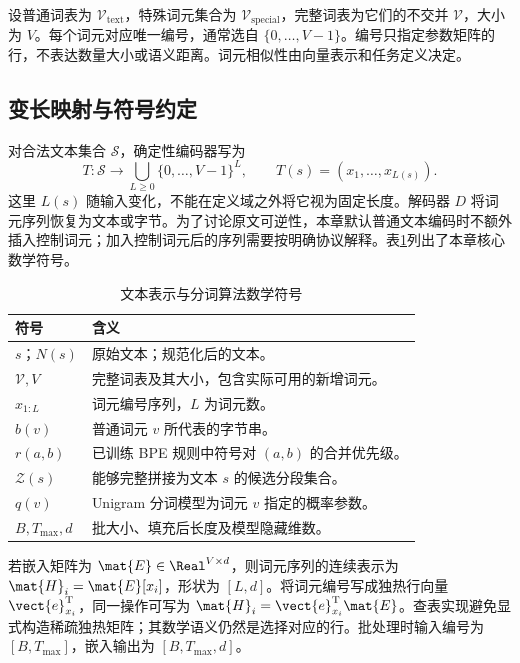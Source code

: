 \documentclass[../textbook.tex]{subfiles}
\begin{document}
设普通词表为 $\mathcal V_{\mathrm{text}}$，特殊词元集合为 $\mathcal V_{\mathrm{special}}$，完整词表为它们的不交并 $\mathcal V$，大小为 $V$。每个词元对应唯一编号，通常选自 $\{0,\ldots,V-1\}$。编号只指定参数矩阵的行，不表达数量大小或语义距离。词元相似性由向量表示和任务定义决定。

\subsection{变长映射与符号约定}
对合法文本集合 $\mathcal S$，确定性编码器写为
\begin{equation}\label{eq:tok-map}
 T:\mathcal S\longrightarrow \bigcup_{L\ge0}\{0,\ldots,V-1\}^{L},
 \qquad T(s)=(x_1,\ldots,x_{L(s)}).
\end{equation}
这里 $L(s)$ 随输入变化，不能在定义域之外将它视为固定长度。解码器 $D$ 将词元序列恢复为文本或字节。为了讨论原文可逆性，本章默认普通文本编码时不额外插入控制词元；加入控制词元后的序列需要按明确协议解释。表\ref{tab:tokenization-notations}列出了本章核心数学符号。

\begin{table}[htbp]
\centering
\caption{文本表示与分词算法数学符号}\label{tab:tokenization-notations}
\begin{tabularx}{\linewidth}{p{24mm}X}
\toprule 符号 & 含义\\\midrule
$s$；$N(s)$ & 原始文本；规范化后的文本。\\
$\mathcal V,V$ & 完整词表及其大小，包含实际可用的新增词元。\\
$x_{1:L}$ & 词元编号序列，$L$ 为词元数。\\
$b(v)$ & 普通词元 $v$ 所代表的字节串。\\
$r(a,b)$ & 已训练 BPE 规则中符号对 $(a,b)$ 的合并优先级。\\
$\mathcal Z(s)$ & 能够完整拼接为文本 $s$ 的候选分段集合。\\
$q(v)$ & Unigram 分词模型为词元 $v$ 指定的概率参数。\\
$B,T_{\max},d$ & 批大小、填充后长度及模型隐藏维数。\\
\bottomrule
\end{tabularx}
\end{table}

若嵌入矩阵为 $\mat{E}\in\Real^{V\times d}$，则词元序列的连续表示为 $\mat{H}_i=\mat{E}[x_i]$，形状为 $[L,d]$。将词元编号写成独热行向量 $\vect{e}_{x_i}^{\mathrm{T}}$，同一操作可写为 $\mat{H}_i=\vect{e}_{x_i}^{\mathrm{T}}\mat{E}$。查表实现避免显式构造稀疏独热矩阵；其数学语义仍然是选择对应的行。批处理时输入编号为 $[B,T_{\max}]$，嵌入输出为 $[B,T_{\max},d]$。
\end{document}
